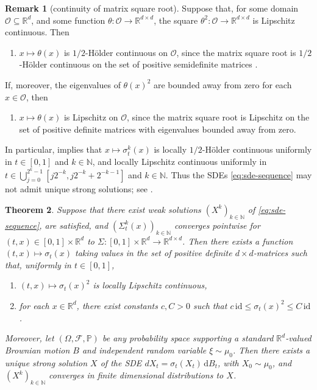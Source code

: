 \documentclass[12pt,oneside]{amsart}
\newtheorem{theorem}{Theorem}[section]
\theoremstyle{definition}
\newtheorem{remark}[theorem]{Remark}
\newcommand{\F}{\mathcal F}
\newcommand{\id}{\mathrm{id}}
\newcommand{\D}{\mathrm{d}}
\newcommand{\N}{\mathbb N}
\newcommand{\R}{\mathbb R}
\def\P{{\mathbb P}}
\def\R{{\mathbb R}}
\numberwithin{equation}{section}
\begin{document}
\begin{remark}[continuity of matrix square root]\label{rem:square-root}
	Suppose that, for some domain $\mathcal O \subseteq \R^d$, and some function $\theta \colon \mathcal O \to \R^{d \times d}$, the square $\theta^2 \colon \mathcal O \to \R^{d \times d}$ is Lipschitz continuous. Then
	\begin{enumerate}[label = (\roman*)]
		\item $x \mapsto \theta(x)$ is $1/2$-H\"older  continuous on $\mathcal O$, since the matrix square root is $1/2$-H\"older  continuous on the set of positive semidefinite matrices \cite[Theorem 1.1]{Wi09}.
	\end{enumerate}
	If, moreover, the eigenvalues of $\theta(x)^2$ are bounded away from zero for each $x \in \mathcal O$, then
	\begin{enumerate}[label = (\roman*), start = 2]
		\item $x \mapsto \theta(x)$ is Lipschitz on $\mathcal O$, since the matrix square root is Lipschitz on the set of positive definite matrices with eigenvalues bounded away from zero.
	\end{enumerate}
	
	In particular,  implies that $x \mapsto \sigma^k_t(x)$ is locally $1/2$-H\"older continuous uniformly in $t \in [0, 1]$ and $k \in \N$, and locally Lipschitz continuous uniformly in $t \in \bigcup_{j = 0}^{2^k - 1} [j 2^{-k}, j 2^{-k} +2^{-k-1}]$ and $k \in \N$.
	Thus the SDEs \eqref{eq:sde-sequence} may not admit unique strong solutions; see \cite[Remark 2]{YW2}.
\end{remark}

\begin{theorem}
    \label{thm:fdd_convergence}
    Suppose that there exist weak solutions $(X^k)_{k \in \N}$ of \eqref{eq:sde-sequence},  are satisfied, and $(\Sigma^k_t(x))_{k \in \N}$ converges pointwise for $(t,x) \in [0,1] \times \R^d$ to $\Sigma \colon [0,1] \times \R^d \to \R^{d \times d}$.
    Then there exists a function $(t, x) \mapsto \sigma_t(x)$ taking values in the set of positive definite $d \times d$-matrices such that, uniformly in $t \in [0, 1]$,
    \begin{enumerate}[label = (\roman*)]
    	\item $(t, x) \mapsto \sigma_t(x)^2$ is locally Lipschitz continuous,
    	\item for each $x \in \R^d$, there exist constants $c, C > 0$ such that $c \, \id \leq \sigma_t(x)^2 \leq C \, \id$.
    \end{enumerate}
    Moreover, let $(\Omega, \F, \P)$ be any probability space supporting a standard $\R^d$-valued Brownian motion $B$ and independent random variable $\xi \sim \mu_0$. Then there exists a unique strong solution $X$ of the SDE $dX_t = \sigma_t(X_t) \, \D B_t$, with $X_0 \sim \mu_0$, and $(X^k)_{k \in \N}$ converges in finite dimensional distributions to $X$.
\end{theorem}
\end{document}
